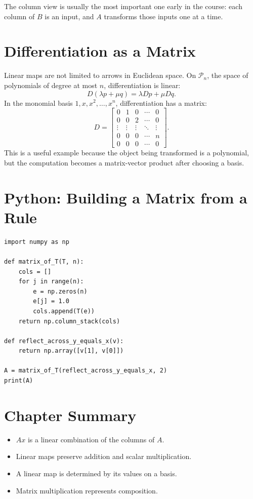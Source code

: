 The column view is usually the most important one early in the course: each
column of $B$ is an input, and $A$ transforms those inputs one at a time.

\section{Differentiation as a Matrix}

Linear maps are not limited to arrows in Euclidean space. On
$\mathcal P_n$, the space of polynomials of degree at most $n$, differentiation
is linear:
\[
  D(\lambda p+\mu q)=\lambda Dp+\mu Dq.
\]
In the monomial basis $1,x,x^2,\ldots,x^n$, differentiation has a matrix:
\[
  D=
  \begin{bmatrix}
  0&1&0&\cdots&0\\
  0&0&2&\cdots&0\\
  \vdots&\vdots&\vdots&\ddots&\vdots\\
  0&0&0&\cdots&n\\
  0&0&0&\cdots&0
  \end{bmatrix}.
\]
This is a useful example because the object being transformed is a polynomial,
but the computation becomes a matrix-vector product after choosing a basis.

\section{Python: Building a Matrix from a Rule}

\begin{lstlisting}
import numpy as np

def matrix_of_T(T, n):
    cols = []
    for j in range(n):
        e = np.zeros(n)
        e[j] = 1.0
        cols.append(T(e))
    return np.column_stack(cols)

def reflect_across_y_equals_x(v):
    return np.array([v[1], v[0]])

A = matrix_of_T(reflect_across_y_equals_x, 2)
print(A)
\end{lstlisting}

\section*{Chapter Summary}

\begin{itemize}
  \item $Ax$ is a linear combination of the columns of $A$.
  \item Linear maps preserve addition and scalar multiplication.
  \item A linear map is determined by its values on a basis.
  \item Matrix multiplication represents composition.
\end{itemize}

